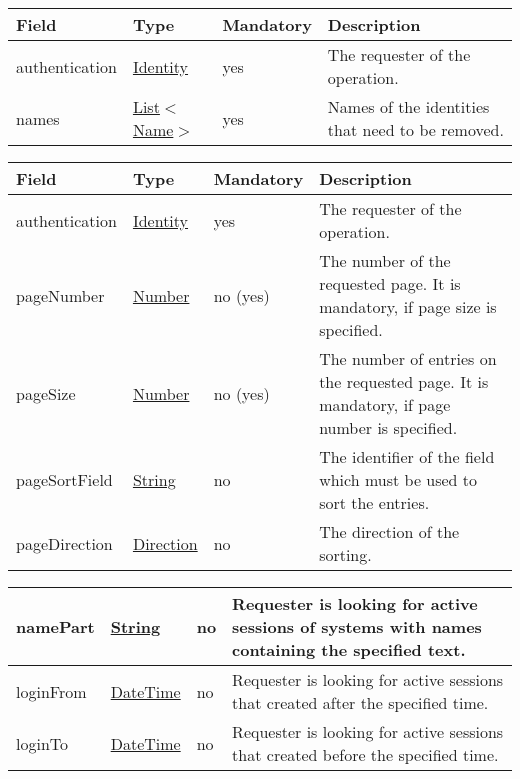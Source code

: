 \documentclass[a4paper]{arrowhead}
\newcommand{\pref}[1]{{\textcolor{ArrowheadGrey}{\hyperref[sec:model:primitives:#1]{#1}}}}
\begin{document}

\begin{table}[ht!]
\begin{tabularx}{\textwidth}{| p{2.5cm} | p{2.5cm} | p{2cm} | X |} \hline
\rowcolor{gray!33} Field & Type & Mandatory & Description \\ \hline
authentication & \hyperref[sec:model:Identity]{Identity} & yes & The requester of the operation. \\ \hline
names &  \pref{List}$<$\pref{Name}$>$ & yes & Names of the identities that need to be removed. \\ \hline
\end{tabularx}
\end{table}


\begin{table}[ht!]
\begin{tabularx}{\textwidth}{| p{4.3cm} | p{4.8cm} | p{2cm} | X |} \hline
\rowcolor{gray!33} Field & Type & Mandatory & Description \\ \hline
authentication & \hyperref[sec:model:Identity]{Identity} & yes & The requester of the operation. \\ \hline
pageNumber & \pref{Number} & no (yes) & The number of the requested page. It is mandatory, if page size is specified. \\ \hline
pageSize & \pref{Number} & no (yes) & The number of entries on the requested page. It is mandatory, if page number is specified. \\ \hline
pageSortField & \pref{String} & no & The identifier of the field which must be used to sort the entries. \\ \hline
pageDirection & \pref{Direction} & no & The direction of the sorting. \\ \hline
\end{tabularx}
\end{table}

\begin{table}[ht!]
\begin{tabularx}{\textwidth}{| p{4.3cm} | p{4.8cm} | p{2cm} | X |} \hline
namePart &  \pref{String} & no & Requester is looking for active sessions of systems with names containing the specified text. \\ \hline
loginFrom &  \pref{DateTime} & no & Requester is looking for active sessions that created after the specified time. \\ \hline
loginTo &  \pref{DateTime} & no & Requester is looking for active sessions that created before the specified time. \\ \hline
\end{tabularx}
\end{table}
\end{document}
